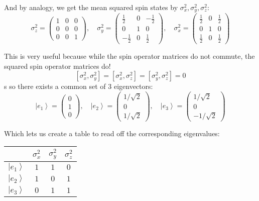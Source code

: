 \documentclass[12pt]{article}
\newcommand{\ket}[1]{\left\vert #1 \right\rangle}
\begin{document}
        And by analogy, we get the mean squared spin states by $\sigma_x^2, \sigma_y^2, \sigma_z^2$: 
        \[\sigma_z^2 = \begin{pmatrix}
            1 & 0 & 0\\
            0 & 0 & 0\\
            0 & 0 & 1
        \end{pmatrix}, \quad \sigma_y^2 = \begin{pmatrix}
            \frac{1}{2} & 0 & -\frac{1}{2}\\
            0 & 1 & 0\\
            -\frac{1}{2} & 0 & \frac{1}{2}
        \end{pmatrix}, \quad \sigma_x^2 = \begin{pmatrix}
            \frac{1}{2} & 0 & \frac{1}{2}\\
            0 & 1 & 0\\
            \frac{1}{2} & 0 & \frac{1}{2}
        \end{pmatrix}\]

        This is very useful because while the spin operator matrices do not commute, the squared spin operator matrices do!
        \[[\sigma^2_x, \sigma^2_y] = [\sigma^2_x, \sigma^2_z] = [\sigma^2_y, \sigma^2_z] = 0\]s
        so there exists a common set of $3$ eigenvectors: 
        \[\ket{e_1} = \begin{pmatrix}
            0\\1\\0
        \end{pmatrix}, \quad \ket{e_2} = \begin{pmatrix}
            1/\sqrt 2\\0\\1/\sqrt 2
        \end{pmatrix}, \quad \ket{e_3} =  \begin{pmatrix}
            1/\sqrt 2\\0\\ -1/\sqrt 2
        \end{pmatrix}\]

        Which lets us create a table to read off the corresponding eigenvalues:
        \begin{center}
            \begin{tabular*}{1.28in}{|c|ccc|}
                \hline 
                & $\sigma_x^2$ & $\sigma_y^2$ & $\sigma_z^2$\\
                \hline
                $\ket{e_1}$ & $1$ & $1$ & $0$\\
                $\ket{e_2}$ & $1$ & $0$ & $1$\\
                $\ket{e_3}$ & $0$ & $1$ & $1$\\
                \hline
            \end{tabular*}
        \end{center}
\end{document}
